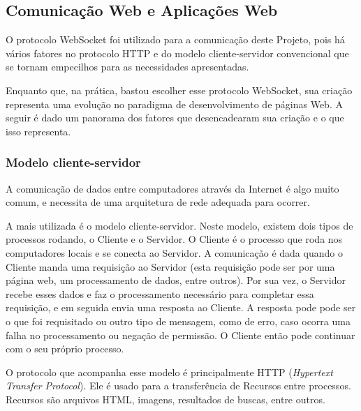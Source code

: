 \documentclass[a4paper,12pt]{article}
\begin{document}



\newpage
\subsection{Comunicação Web e Aplicações Web}


O protocolo WebSocket foi utilizado para a comunicação deste Projeto, pois há vários fatores no protocolo HTTP e do modelo cliente-servidor convencional que se tornam empecilhos para as necessidades apresentadas.

Enquanto que, na prática, bastou escolher esse protocolo WebSocket, sua criação representa uma evolução no paradigma de desenvolvimento de páginas Web. A seguir é dado um panorama dos fatores que desencadearam sua criação e o que isso representa.


\subsubsection{Modelo cliente-servidor}

A comunicação de dados entre computadores através da Internet é algo muito comum, e necessita de uma arquitetura de rede adequada para ocorrer.

A mais utilizada é o modelo cliente-servidor. Neste modelo, existem dois tipos de processos rodando, o Cliente e o Servidor. O Cliente é o processo que roda nos computadores locais e se conecta ao Servidor. A comunicação é dada quando o Cliente manda uma requisição ao Servidor (esta requisição pode ser por uma página web, um processamento de dados, entre outros). Por sua vez, o Servidor recebe esses dados e faz o processamento necessário para completar essa requisição, e em seguida envia uma resposta ao Cliente. A resposta pode pode ser o que foi requisitado ou outro tipo de mensagem, como de erro, caso ocorra uma falha no processamento ou negação de permissão. O Cliente então pode continuar com o seu próprio processo.



O protocolo que acompanha esse modelo é principalmente HTTP (\emph{Hypertext Transfer Protocol}). Ele é usado para a transferência de Recursos entre processos. Recursos são arquivos HTML, imagens, resultados de buscas, entre outros.
\end{document}
